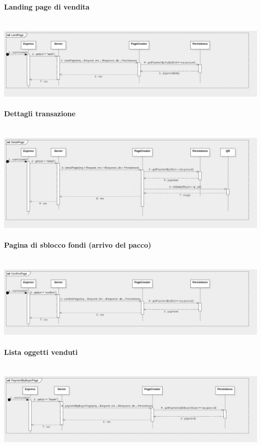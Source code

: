 \documentclass[a4paper, 12pt]{article}
\begin{document}
\paragraph{Landing page di vendita}\\
\includegraphics[width=1.0\textwidth]{land}

\paragraph{Dettagli transazione}\\
\includegraphics[width=1.0\textwidth]{detail}
\clearpage

\paragraph{Pagina di sblocco fondi (arrivo del pacco)}\\
\includegraphics[width=1.0\textwidth]{confirm}

\paragraph{Lista oggetti venduti}\\
\includegraphics[width=1.0\textwidth]{buyer}
\end{document}
